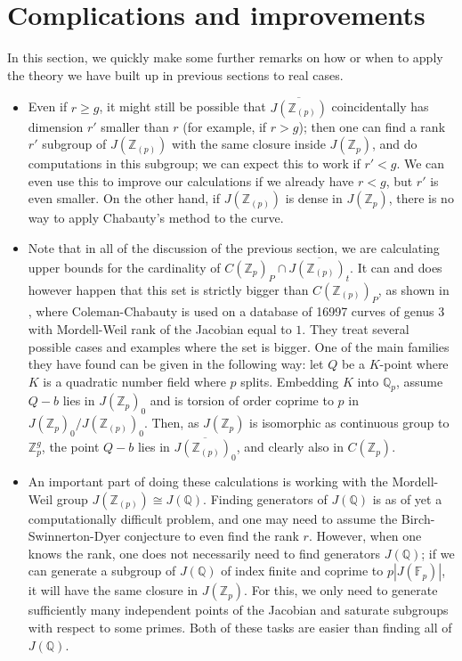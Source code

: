 \documentclass[12pt]{article}
\newcommand{\Z}{\mathbb{Z}}
\newcommand{\Q}{\mathbb{Q}}
\newcommand{\F}{\mathbb{F}}
\theoremstyle{plain}
\theoremstyle{definition}
\theoremstyle{remark}
\begin{document}
\section{Complications and improvements}
\label{section:remarks}
In this section, we quickly make some further remarks on how or when to apply the theory we have built up in previous sections to real cases.
\begin{itemize} 
\item Even if $r \geq g$, it might still be possible that $\overline{J(\Z_{(p)})}$ coincidentally has dimension $r'$ smaller than $r$ (for example, if $r > g$); then one can find a rank $r'$ subgroup of $J(\Z_{(p)})$ with the same closure inside $J(\Z_p)$, and do computations in this subgroup; we can expect this to work if $r' < g$. We can even use this to improve our calculations if we already have $r < g$, but $r'$ is even smaller. On the other hand, if $J(\Z_{(p)})$ is dense in $J(\Z_p)$, there is no way to apply Chabauty's method to the curve.
\item Note that in all of the discussion of the previous section, we are calculating upper bounds for the cardinality of $C(\Z_p)_P \cap \overline{J(\Z_{(p)})_t}$. It can and does however happen that this set is strictly bigger than $C(\Z_{(p)})_P$, as shown in \cite{Balakrishnan19}, where Coleman-Chabauty is used on a database of 16997 curves of genus $3$ with Mordell-Weil rank of the Jacobian equal to $1$. They treat several possible cases and examples where the set is bigger. One of the main families they have found can be given in the following way: let $Q$ be a $K$-point where $K$ is a quadratic number field where $p$ splits. Embedding $K$ into $\Q_p$, assume $Q-b$ lies in $J(\Z_p)_0$ and is torsion of order coprime to $p$ in $J(\Z_p)_0/J(\Z_{(p)})_0$. Then, as $J(\Z_p)$ is isomorphic as continuous group to $\Z_p^g$, the point $Q-b$ lies in $\overline{J(\Z_{(p)})_0}$, and clearly also in $C(\Z_p)$.
\item An important part of doing these calculations is working with the Mordell-Weil group $J(\Z_{(p)}) \cong J(\Q)$. Finding generators of $J(\Q)$ is as of yet a computationally difficult problem, and one may need to assume the Birch-Swinnerton-Dyer conjecture to even find the rank $r$. However, when one knows the rank, one does not necessarily need to find generators $J(\Q)$; if we can generate a subgroup of $J(\Q)$ of index finite and coprime to $p|J(\F_p)|$, it will have the same closure in $J(\Z_p)$. For this, we only need to generate sufficiently many independent points of the Jacobian and saturate subgroups with respect to some primes. Both of these tasks are easier than finding all of $J(\Q)$.

\end{itemize}
\end{document}
